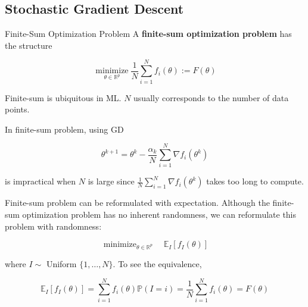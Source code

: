 \subsection{Stochastic Gradient Descent}

\begin{frame}[allowframebreaks]

\begin{mydefinitionblock}{2.7}{Finite-Sum Optimization Problem}
    A \textbf{finite-sum optimization problem} has the structure

    $$
    \underset{\theta \in \mathbb{R}^{p}}{\operatorname{minimize}} \frac{1}{N} \sum_{i=1}^{N} f_{i}(\theta):=F(\theta)
    $$

    Finite-sum is ubiquitous in ML. $N$ usually corresponds to the number of data points.
\end{mydefinitionblock}

\end{frame}


\begin{frame}[allowframebreaks]

In finite-sum problem, using GD

$$
\theta^{k+1}=\theta^{k}-\frac{\alpha_{k}}{N} \sum_{i=1}^{N} \nabla f_{i}\left(\theta^{k}\right)
$$

is impractical when $N$ is large since $\frac{1}{N} \sum_{i=1}^{N} \nabla f_{i}\left(\theta^{k}\right)$ takes too long to compute.

\end{frame}

\begin{frame}[allowframebreaks]

\begin{myconceptblock}{2.8}{Finite-sum problem can be reformulated with expectation.}
    Although the finite-sum optimization problem has no inherent randomness, we can reformulate this problem with randomness:

    $$
    \operatorname{minimize}_{\theta \in \mathbb{R}^{p}} \quad \mathbb{E}_{I}\left[f_{I}(\theta)\right]
    $$

    where $I \sim$ Uniform $\{1, \ldots, N\}$. To see the equivalence,

    $$
    \mathbb{E}_{I}\left[f_{I}(\theta)\right]=\sum_{i=1}^{N} f_{i}(\theta) \mathbb{P}(I=i)=\frac{1}{N} \sum_{i=1}^{N} f_{i}(\theta)=F(\theta)
    $$
\end{myconceptblock}

\end{frame}

